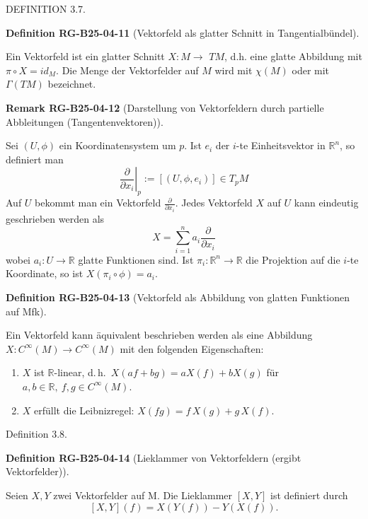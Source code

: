 \documentclass[10pt, letterpaper]{article}
\newcommand{\CustomHeading}[3]{%
  \par\medskip\noindent%
  \textbf{#1 #2} \textnormal{(#3)}.\enskip%
}
\newenvironment{DEF}[2]{\begin{unitbox}\CustomHeading{Definition}{#1}{#2}}{\end{unitbox}}
\newenvironment{REM}[2]{\begin{unitbox}\CustomHeading{Remark}{#1}{#2}}{\end{unitbox}}
\begin{document}
DEFINITION 3.7. 

\begin{DEF}{RG-B25-04-11}{Vektorfeld als glatter Schnitt in Tangentialbündel}
Ein Vektorfeld ist ein glatter Schnitt $X: M \rightarrow$ $T M$, d.h. eine glatte Abbildung mit $\pi \circ X=i d_{M}$. Die Menge der Vektorfelder auf $M$ wird mit $\chi(M)$ oder mit $\Gamma(T M)$ bezeichnet.
\end{DEF}


\begin{REM}{RG-B25-04-12}{Darstellung von Vektorfeldern durch partielle Abbleitungen (Tangentenvektoren)}
Sei $(U, \phi)$ ein Koordinatensystem um $p$. Ist $e_{i}$ der $i$-te Einheitsvektor in $\mathbb{R}^{n}$, so definiert man
$$
\left.\frac{\partial}{\partial x_{i}}\right|_{p}:=\left[\left(U, \phi, e_{i}\right)\right] \in T_{p} M
$$
Auf $U$ bekommt man ein Vektorfeld $\frac{\partial}{\partial x_{i}}$. Jedes Vektorfeld $X$ auf $U$ kann eindeutig geschrieben werden als
$$
X=\sum_{i=1}^{n} a_{i} \frac{\partial}{\partial x_{i}}
$$
wobei $a_{i}: U \rightarrow \mathbb{R}$ glatte Funktionen sind. Ist $\pi_{i}: \mathbb{R}^{n} \rightarrow \mathbb{R}$ die Projektion auf die $i$-te Koordinate, so ist $X\left(\pi_{i} \circ \phi\right)=a_{i}$.
\end{REM}


\begin{DEF}{RG-B25-04-13}{Vektorfeld als Abbildung von glatten Funktionen auf Mfk}
Ein Vektorfeld kann äquivalent beschrieben werden als eine Abbildung $X: C^{\infty}(M) \rightarrow C^{\infty}(M)$ mit den folgenden Eigenschaften:\\
\begin{enumerate}
  \item $X$ ist $\mathbb{R}$-linear, d.\,h.\ $X(a f + b g) = a X(f) + b X(g)$ für $a, b \in \mathbb{R},\ f, g \in C^{\infty}(M)$.
  \item $X$ erfüllt die Leibnizregel: $X(fg) = f\, X(g) + g\, X(f)$.
\end{enumerate}
\end{DEF}




Definition 3.8. 


\begin{DEF}{RG-B25-04-14}{Lieklammer von Vektorfeldern (ergibt Vektorfelder)}
Seien $X, Y$ zwei Vektorfelder auf M. Die Lieklammer $[X, Y]$ ist definiert durch
$$
[X, Y](f)=X(Y(f))-Y(X(f)) .
$$
\end{DEF}
\end{document}
